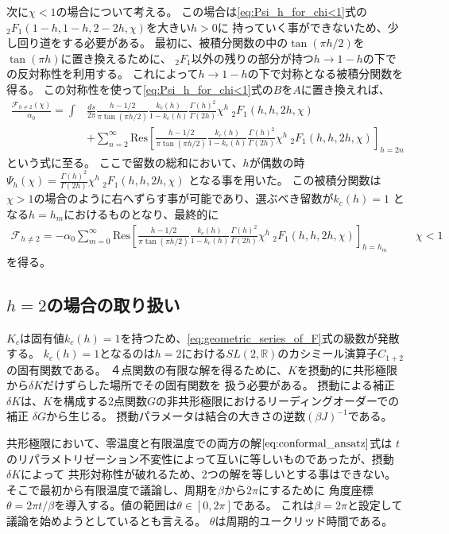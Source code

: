 次に$\chi < 1$の場合について考える。
この場合は\eqref{eq:Psi_h_for_chi<1}式の${}_2F_1(1-h,1-h,2-2h,\chi)$を大きい$h > 0$に
持っていく事ができないため、少し回り道をする必要がある。
最初に、被積分関数の中の$\tan(\pi h/2)$を$\tan(\pi h)$に置き換えるために、
${}_2F_1$以外の残りの部分が持つ$h\to 1-h$の下での反対称性を利用する。
これによって$h\to 1-h$の下で対称となる被積分関数を得る。
この対称性を使って\eqref{eq:Psi_h_for_chi<1}式の$B$を$A$に置き換えれば、
\begin{align}
	\frac{\mathcal{F}_{h\neq 2}(\chi)}{\alpha_0}
	= \int &\frac{ds}{2\pi}\frac{h-1/2}{\pi\tan(\pi h/2)}
		\frac{k_c(h)}{1-k_c(h)}\frac{\Gamma(h)^2}{\Gamma(2h)}
		\chi^h\ {}_2F_1(h, h, 2h, \chi)\nonumber\\
	&+ \sum_{n=2}^{\infty}\mathrm{Res}\left[
		\frac{h-1/2}{\pi\tan(\pi h/2)}\frac{k_c(h)}{1-k_c(h)}\frac{\Gamma(h)^2}{\Gamma(2h)}
		\chi^h\ {}_2F_1(h, h, 2h, \chi)
	\right]_{h=2n}
\end{align}
という式に至る。
ここで留数の総和において、$h$が偶数の時
$\Psi_h(\chi) = \frac{\Gamma(h)^2}{\Gamma(2h)}\chi^h\ {}_2F_1(h, h, 2h, \chi)$
となる事を用いた。
この被積分関数は$\chi > 1$の場合のように右へずらす事が可能であり、選ぶべき留数が$k_c(h)=1$
となる$h = h_m$におけるものとなり、最終的に
\begin{align}
	\mathcal{F}_{h\neq 2} = -\alpha_0\sum_{m=0}^{\infty}\mathrm{Res}\left[
		\frac{h-1/2}{\pi\tan(\pi h/2)}\frac{k_c(h)}{1-k_c(h)}\frac{\Gamma(h)^2}{\Gamma(2h)}
		\chi^h\ {}_2F_1(h, h, 2h, \chi)
	\right]_{h=h_m}
	\hspace{30pt}\chi < 1
\end{align}
を得る。

\subsection{$h = 2$の場合の取り扱い}
$K_c$は固有値$k_c(h) = 1$を持つため、\eqref{eq:geometric_series_of_F}式の級数が発散する。
$k_c(h) = 1$となるのは$h = 2$における$SL(2, \mathbb{R})$のカシミール演算子$C_{1+2}$の固有関数である。
４点関数の有限な解を得るために、$K$を摂動的に共形極限から$\delta K$だけずらした場所でその固有関数を
扱う必要がある。
摂動による補正$\delta K$は、$K$を構成する2点関数$G$の非共形極限におけるリーディングオーダーでの補正
$\delta G$から生じる。
摂動パラメータは結合の大きさの逆数$(\beta J)^{-1}$である。

共形極限において、零温度と有限温度での両方の解$\eqref{eq:conformal_ansatz}$式は
$t$のリパラメトリゼーション不変性によって互いに等しいものであったが、摂動$\delta K$によって
共形対称性が破れるため、2つの解を等しいとする事はできない。
そこで最初から有限温度で議論し、周期を$\beta$から$2\pi$にするために
角度座標$\theta = 2\pi t / \beta$を導入する。値の範囲は$\theta \in [0, 2\pi]$である。
これは$\beta = 2\pi$と設定して議論を始めようとしているとも言える。
$\theta$は周期的ユークリッド時間である。

